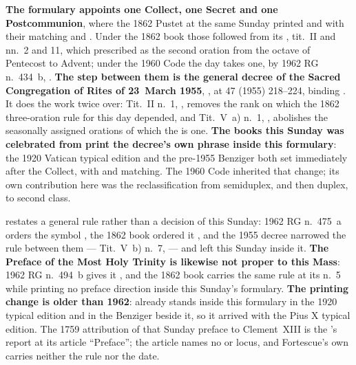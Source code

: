 \textbf{The formulary appoints one Collect, one Secret and one
Postcommunion}, where the 1862 Pustet at the same Sunday printed  and  with their matching
 and . Under the 1862 book those
followed from its , tit.~II and 
nn.~2 and 11, which prescribed  as the second oration from the
octave of Pentecost to Advent; under the 1960 Code the day takes one, by 1962
RG n.~434~b, . \textbf{The step between them is the
general decree of the Sacred Congregation of Rites of 23~March 1955}, , at 
47 (1955) 218--224, binding . It does the
work twice over: Tit.~II n.~1, ,
removes the rank on which the 1862 three-oration rule for this day depended, and
Tit.~V~a) n.~1, \textbf{}, abolishes the seasonally assigned orations of which the
 is one. \textbf{The books this Sunday was celebrated from
print the decree's own phrase inside this formulary}: the 1920 Vatican typical
edition and the pre-1955 Benziger both set  immediately after the Collect, with
 and  matching. The 1960 Code
inherited that change; its own contribution here was the reclassification from
semiduplex, and then duplex, to second class.

 restates a general rule rather than a decision of this Sunday:
1962 RG n.~475~a orders the symbol , the 1862
book ordered it , and the 1955 decree
narrowed the rule between them --- Tit.~V~b) n.~7,  --- and left this Sunday inside it.
\textbf{The Preface of the Most Holy Trinity is likewise not proper to this
Mass}: 1962 RG n.~494~b gives it , and the 1862 book
carries the same rule at its  n.~5 while printing no
preface direction inside this Sunday's formulary. \textbf{The printing change is
older than 1962}:  already stands inside this
formulary in the 1920 typical edition and in the Benziger beside it, so it
arrived with the Pius X typical edition. The 1759 attribution of that Sunday
preface to Clement~XIII is the 's report at its
article ``Preface''; the article names no  or  locus,
and Fortescue's own  carries neither the rule nor the date.

